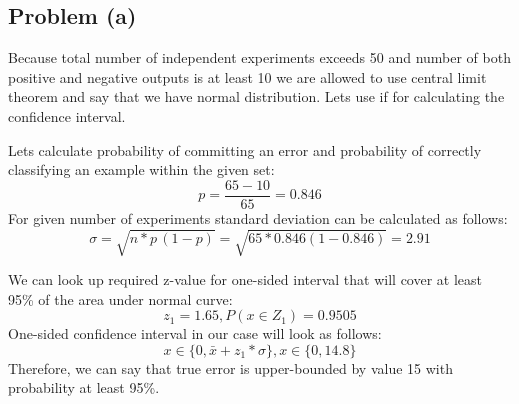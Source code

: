\subsection*{Problem (a)}

Because total number of independent experiments exceeds 50 and number of both positive and negative outputs is at least 10 we are allowed to use central limit theorem and say that we have normal distribution. Lets use if for calculating the confidence interval.

Lets calculate probability of committing an error and probability of correctly classifying an example within the given set:
\[
p=\frac{65-10}{65}=0.846
\]
For given number of experiments standard deviation can be calculated as follows:
 \[
\sigma=\sqrt{n*p\,(1-p)}=\sqrt{65*0.846(1-0.846)}=2.91
\]

We can look up required z-value for one-sided interval that will cover at least 95\% of the area under normal curve:
 \[
z_1=1.65, P(x\in Z_1)=0.9505
\]
One-sided confidence interval in our case will look as follows:
 \[
x\in \{0, \bar{x}+z_1*\sigma\},
x\in \{0, 14.8\}
\]
Therefore, we can say that true error is upper-bounded by value 15 with probability at least 95\%.
